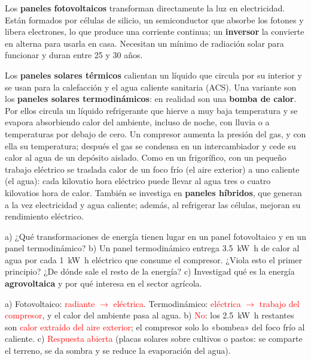 Los \textbf{paneles fotovoltaicos} transforman directamente la luz en electricidad. Están formados por células de silicio, un
semiconductor que absorbe los fotones y libera electrones, lo que produce una corriente continua; un \textbf{inversor} la convierte
en alterna para usarla en casa. Necesitan un mínimo de radiación solar para funcionar y duran entre 25 y 30 años.

Los \textbf{paneles solares térmicos} calientan un líquido que circula por su interior y se usan para la calefacción y el agua
caliente sanitaria (ACS). Una variante son los \textbf{paneles solares termodinámicos}: en realidad son una \textbf{bomba de calor}.
Por ellos circula un líquido refrigerante que hierve a muy baja temperatura y se evapora absorbiendo calor del ambiente, incluso de
noche, con lluvia o a temperaturas por debajo de cero. Un compresor aumenta la presión del gas, y con ella su temperatura; después
el gas se condensa en un intercambiador y cede su calor al agua de un depósito aislado. Como en un frigorífico, con un pequeño
trabajo eléctrico se traslada calor de un foco frío (el aire exterior) a uno caliente (el agua): cada kilovatio hora eléctrico puede
llevar al agua tres o cuatro kilovatios hora de calor. También se investiga en \textbf{paneles híbridos}, que generan a la vez
electricidad y agua caliente; además, al refrigerar las células, mejoran su rendimiento eléctrico.

\begin{exercise}
    a) ¿Qué transformaciones de energía tienen lugar en un panel fotovoltaico y en un panel termodinámico? b) Un panel termodinámico
    entrega \qty{3.5}{\kilo\watt\hour} de calor al agua por cada \qty{1}{\kilo\watt\hour} eléctrico que consume el compresor. ¿Viola
    esto el primer principio? ¿De dónde sale el resto de la energía? c) Investigad qué es la energía \textbf{agrovoltaica} y por qué
    interesa en el sector agrícola.
    \begin{solu}
        a) Fotovoltaico: \textcolor{red}{radiante \(\rightarrow\) eléctrica}. Termodinámico: \textcolor{red}{eléctrica \(\rightarrow\)
        trabajo del compresor}, y el calor del ambiente pasa al agua. b) \textcolor{red}{No}: los \qty{2.5}{\kilo\watt\hour}
        restantes son \textcolor{red}{calor extraído del aire exterior}; el compresor solo lo «bombea» del foco frío al caliente.
        c) \textcolor{red}{Respuesta abierta} (placas solares sobre cultivos o pastos: se comparte el terreno, se da sombra y se
        reduce la evaporación del agua).
    \end{solu}
\end{exercise}

